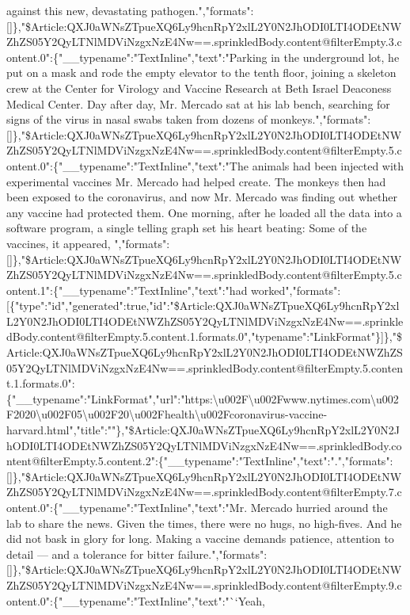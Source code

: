 against this new, devastating
pathogen.","formats":{[}{]}\},"\$Article:QXJ0aWNsZTpueXQ6Ly9hcnRpY2xlL2Y0N2JhODI0LTI4ODEtNWZhZS05Y2QyLTNlMDViNzgxNzE4Nw==.sprinkledBody.content@filterEmpty.3.content.0":\{"\_\_typename":"TextInline","text":"Parking
in the underground lot, he put on a mask and rode the empty elevator to
the tenth floor, joining a skeleton crew at the Center for Virology and
Vaccine Research at Beth Israel Deaconess Medical Center. Day after day,
Mr. Mercado sat at his lab bench, searching for signs of the virus in
nasal swabs taken from dozens of
monkeys.","formats":{[}{]}\},"\$Article:QXJ0aWNsZTpueXQ6Ly9hcnRpY2xlL2Y0N2JhODI0LTI4ODEtNWZhZS05Y2QyLTNlMDViNzgxNzE4Nw==.sprinkledBody.content@filterEmpty.5.content.0":\{"\_\_typename":"TextInline","text":"The
animals had been injected with experimental vaccines Mr. Mercado had
helped create. The monkeys then had been exposed to the coronavirus, and
now Mr. Mercado was finding out whether any vaccine had protected them.
One morning, after he loaded all the data into a software program, a
single telling graph set his heart beating: Some of the vaccines, it
appeared,
","formats":{[}{]}\},"\$Article:QXJ0aWNsZTpueXQ6Ly9hcnRpY2xlL2Y0N2JhODI0LTI4ODEtNWZhZS05Y2QyLTNlMDViNzgxNzE4Nw==.sprinkledBody.content@filterEmpty.5.content.1":\{"\_\_typename":"TextInline","text":"had
worked","formats":{[}\{"type":"id","generated":true,"id":"\$Article:QXJ0aWNsZTpueXQ6Ly9hcnRpY2xlL2Y0N2JhODI0LTI4ODEtNWZhZS05Y2QyLTNlMDViNzgxNzE4Nw==.sprinkledBody.content@filterEmpty.5.content.1.formats.0","typename":"LinkFormat"\}{]}\},"\$Article:QXJ0aWNsZTpueXQ6Ly9hcnRpY2xlL2Y0N2JhODI0LTI4ODEtNWZhZS05Y2QyLTNlMDViNzgxNzE4Nw==.sprinkledBody.content@filterEmpty.5.content.1.formats.0":\{"\_\_typename":"LinkFormat","url":"https:\textbackslash{}u002F\textbackslash{}u002Fwww.nytimes.com\textbackslash{}u002F2020\textbackslash{}u002F05\textbackslash{}u002F20\textbackslash{}u002Fhealth\textbackslash{}u002Fcoronavirus-vaccine-harvard.html","title":""\},"\$Article:QXJ0aWNsZTpueXQ6Ly9hcnRpY2xlL2Y0N2JhODI0LTI4ODEtNWZhZS05Y2QyLTNlMDViNzgxNzE4Nw==.sprinkledBody.content@filterEmpty.5.content.2":\{"\_\_typename":"TextInline","text":".","formats":{[}{]}\},"\$Article:QXJ0aWNsZTpueXQ6Ly9hcnRpY2xlL2Y0N2JhODI0LTI4ODEtNWZhZS05Y2QyLTNlMDViNzgxNzE4Nw==.sprinkledBody.content@filterEmpty.7.content.0":\{"\_\_typename":"TextInline","text":"Mr.
Mercado hurried around the lab to share the news. Given the times, there
were no hugs, no high-fives. And he did not bask in glory for long.
Making a vaccine demands patience, attention to detail --- and a
tolerance for bitter
failure.","formats":{[}{]}\},"\$Article:QXJ0aWNsZTpueXQ6Ly9hcnRpY2xlL2Y0N2JhODI0LTI4ODEtNWZhZS05Y2QyLTNlMDViNzgxNzE4Nw==.sprinkledBody.content@filterEmpty.9.content.0":\{"\_\_typename":"TextInline","text":"``Yeah,
